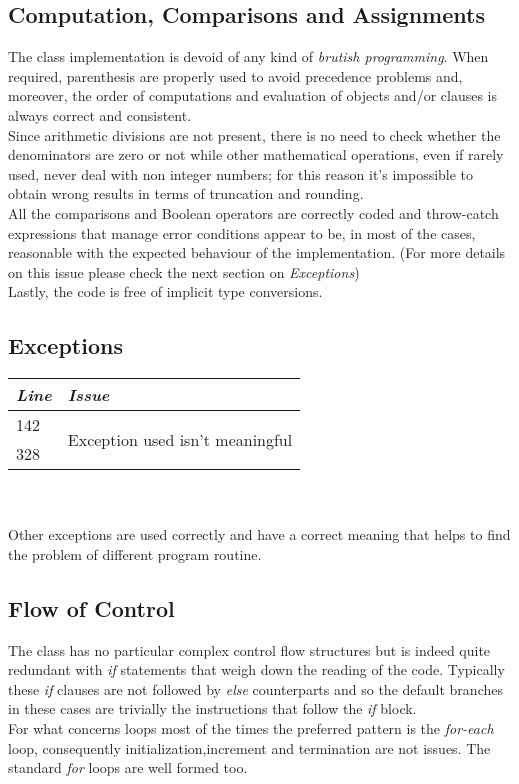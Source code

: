 \documentclass[11pt,a4paper]{report}
\begin{document}
\subsection{Computation, Comparisons and Assignments}
The class implementation is devoid of any kind of \textit{brutish programming}. When required, parenthesis are properly used to avoid precedence problems and, moreover, the order of computations and evaluation of objects and/or clauses is always correct and consistent.\\
Since arithmetic divisions are not present, there is no need to check whether the denominators are zero or not while other mathematical operations, even if rarely used, never deal with non integer numbers; for this reason it's impossible to obtain wrong results in terms of truncation and rounding.\\
All the comparisons and Boolean operators are correctly coded and throw-catch expressions that manage error conditions appear to be, in most of the cases, reasonable with the expected behaviour of the implementation. (For more details on this issue please check the next section on \textit{Exceptions})\\
Lastly, the code is free of implicit type conversions.
\subsection{Exceptions}
\begin{tabularx}{\textwidth}{|l|X|}
	\hline
	\textit{Line} & \textit{Issue}\\
	\hline
	\hline
	142 & \multirow{2}{*}{Exception used isn't meaningful}\\
	328 & \\
	\hline
\end{tabularx}\\
\\
Other exceptions are used correctly and have a correct meaning that helps to find the problem of different program routine.
\subsection{Flow of Control}
The class has no particular complex control flow structures but is indeed quite redundant with \textit{if} statements that weigh down the reading of the code. Typically these \textit{if} clauses are not followed by \textit{else} counterparts and so the default branches in these cases are trivially the instructions that follow the \textit{if} block.\\For what concerns loops most of the times the preferred pattern is the \textit{for-each} loop, consequently initialization,increment and termination are not issues. The standard \textit{for} loops are well formed too.
\end{document}
